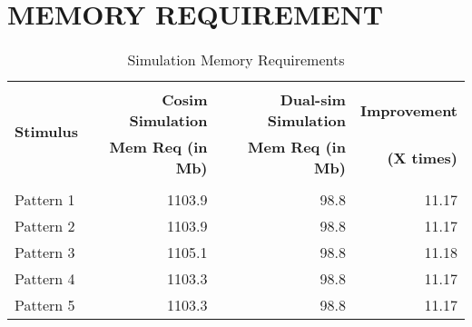 \section{MEMORY REQUIREMENT}
\begin{table}[h!]
\begin{center}
\label{tab:Memory Requirement}
\vspace{0.2cm}
\begin{tabular}{|l|r|r|r|}
\hline
\multirow{3}{*}{\bf Stimulus} & &	&\\ & {\bf Cosim Simulation} 	& {\bf Dual-sim Simulation} & {\bf Improvement } 	\\ & \bf{Mem Req (in Mb)}  &  {\bf{Mem Req (in Mb)}} &  {\bf(X times) }\\



						&				&				&				\\
\hline
Pattern 1 			&1103.9				&98.8				&11.17 				\\

Pattern 2  				&1103.9				&98.8				&11.17				\\

Pattern 3  		&1105.1				&98.8				&11.18				\\

Pattern 4  			&1103.3			&98.8 				&11.17				\\

Pattern 5  				&1103.3				&98.8				&11.17				\\
\hline


\end{tabular}
\end{center}
\caption{Simulation Memory Requirements}

\end{table}


